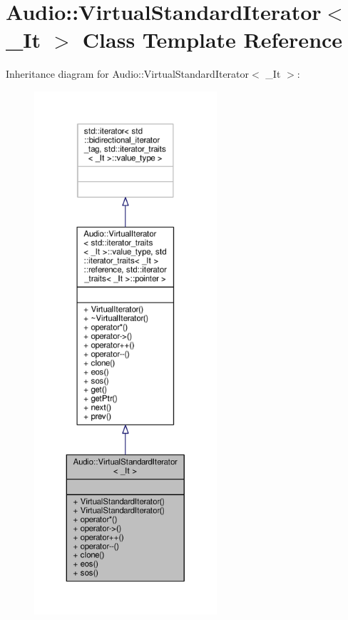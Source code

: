 \hypertarget{classAudio_1_1VirtualStandardIterator}{}\section{Audio\+:\+:Virtual\+Standard\+Iterator$<$ \+\_\+\+It $>$ Class Template Reference}
\label{classAudio_1_1VirtualStandardIterator}


Inheritance diagram for Audio\+:\+:Virtual\+Standard\+Iterator$<$ \+\_\+\+It $>$\+:
\nopagebreak
\begin{figure}[H]
\begin{center}
\leavevmode
\includegraphics[height=550pt]{d0/dba/classAudio_1_1VirtualStandardIterator__inherit__graph}
\end{center}
\end{figure}


